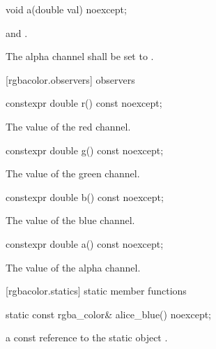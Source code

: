\begin{itemdecl}
void a(double val) noexcept;
\end{itemdecl}
\begin{itemdescr}
\pnum
\requires
{} and .

\pnum
\effects
The alpha channel shall be set to .
\end{itemdescr}

 [rgbacolor.observers]{ observers}

\begin{itemdecl}
constexpr double r() const noexcept;
\end{itemdecl}
\begin{itemdescr}
\pnum
\returns
The value of the red channel.
\end{itemdescr}

\begin{itemdecl}
constexpr double g() const noexcept;
\end{itemdecl}
\begin{itemdescr}
\pnum
\returns
The value of the green channel.
\end{itemdescr}

\begin{itemdecl}
constexpr double b() const noexcept;
\end{itemdecl}
\begin{itemdescr}
\pnum
\returns
The value of the blue channel.
\end{itemdescr}

\begin{itemdecl}
constexpr double a() const noexcept;
\end{itemdecl}
\begin{itemdescr}
\pnum
\returns
The value of the alpha channel.
\end{itemdescr}

 [rgbacolor.statics] { static member functions}

\begin{itemdecl}
static const rgba_color& alice_blue() noexcept;
\end{itemdecl}
\begin{itemdescr}
\pnum
\returns
a const reference to the static  object .
\end{itemdescr}

